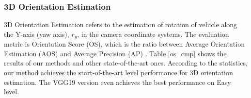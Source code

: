 \documentclass[a4paper,12pt]{article}
\begin{document}
\begin{table}[H]
	\centering
	\caption[Comparison of the 3D localization performance.]{Comparison of the 3D localization accuracy on official KITTI dataset for cars (ours is for cars and vans).}
	\label{3d_local}
\end{table}

\subsubsection{3D Orientation Estimation}
3D Orientation Estimation refers to the estimation of rotation of vehicle along the Y-axis (yaw axis), $r_y$, in the camera coordinate systems. The evaluation metric is Orientation Score (OS), which is the ratio between Average Orientation Estimation (AOS) and Average Precision (AP) \cite{DBLP:journals/corr/MousavianAFK16}. Table \ref{os_cmp} shows the results of our methods and other state-of-the-art ones. According to the statistics, our method achieves the start-of-the-art level performance for 3D orientation estimation. The VGG19 version even achieves the best performance on Easy level.
\end{document}
